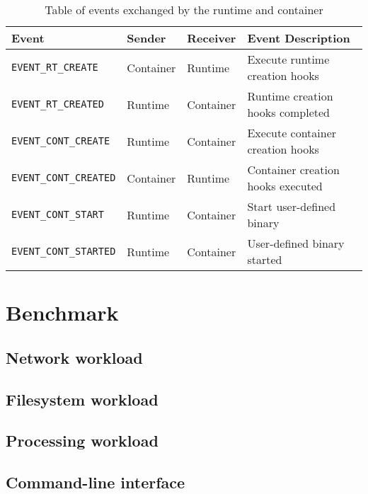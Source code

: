 \begin{table}[h!]
    \centering
    \begin{tabular}{ |m{4cm}|m{2cm}|m{2cm}|m{15em}| }
        \hline
        Event & Sender & Receiver & Event Description \\
        \hline
        \verb|EVENT_RT_CREATE| & Container & Runtime & Execute runtime creation hooks \\
        \hline
        \verb|EVENT_RT_CREATED| & Runtime & Container & Runtime creation hooks completed \\
        \hline 
        \verb|EVENT_CONT_CREATE| & Runtime & Container & Execute container creation hooks \\
        \hline 
        \verb|EVENT_CONT_CREATED| & Container & Runtime & Container creation hooks executed \\
        \hline
        \verb|EVENT_CONT_START| & Runtime & Container & Start user-defined binary \\
        \hline 
        \verb|EVENT_CONT_STARTED| & Runtime & Container & User-defined binary started \\
        \hline
    \end{tabular}
    \caption{Table of events exchanged by the runtime and container}
    \label{table:implementation/runtime/socket-events}
\end{table}

\section{Benchmark}
\label{ch:implementation/benchmark}
\subsection{Network workload}
\subsection{Filesystem workload}
\subsection{Processing workload}
\subsection{Command-line interface}
